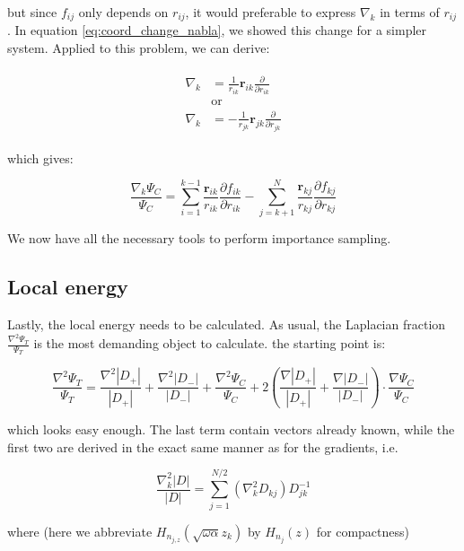 \documentclass[english, a4paper]{article}
\newcommand{\bm}[1]{\mathbf{#1}}
\begin{document}
	but since $f_{ij}$ only depends on $r_{ij}$, it would preferable to express $\nabla_k$ in terms of $r_{ij}$. In equation \ref{eq:coord_change_nabla}, we showed this change for a simpler system. Applied to this problem, we can derive:
	
	\begin{align}
	\begin{split}
	\nabla_k &=  \frac{1}{r_{ik}}\bm{r}_{ik}\frac{\partial}{\partial r_{ik}}\\
	&\text{or}\\
	\nabla_k &=  -\frac{1}{r_{jk}}\bm{r}_{jk}\frac{\partial}{\partial r_{jk}}
	\end{split}
	\end{align}
	
	which gives:
	
	\begin{equation}
	\frac{\nabla_k \Psi_C}{\Psi_C} = \sum_{i=1}^{k-1}\frac{\bm{r}_{ik}}{r_{ik}}\frac{\partial f_{ik}}{\partial r_{ik}} - \sum_{j=k+1}^{N}\frac{\bm{r}_{kj}}{r_{kj}}\frac{\partial f_{kj}}{\partial r_{kj}}
	\end{equation}
	
	We now have all the necessary tools to perform importance sampling.
	
	\subsection{Local energy}
	Lastly, the local energy needs to be calculated. As usual, the Laplacian fraction $\frac{\nabla^2\Psi_T}{\Psi_T}$ is the most demanding object to calculate. the starting point is:
	
	\begin{equation}
	\frac{\nabla^2\Psi_T}{\Psi_T} = \frac{\nabla^2 |D_+|}{|D_+|} + \frac{\nabla^2 |D_-|}{|D_-|} + \frac{\nabla^2 \Psi_C}{\Psi_C} + 2\left( \frac{\nabla |D_+|}{|D_+|} + \frac{\nabla |D_-|}{|D_-|} \right)\cdot\frac{\nabla \Psi_C}{\Psi_C}
	\end{equation}
	
	which looks easy enough. The last term contain vectors already known, while the first two are derived in the exact same manner as for the gradients, i.e.
	
	\begin{equation}
	\frac{\nabla_k^2|D|}{|D|} = \sum_{j=1}^{N/2}(\nabla_k^2D_{kj})D_{jk}^{-1}
	\end{equation}
	
	where (here we abbreviate $H_{n_{j,z}}(\sqrt{\omega\alpha}z_k)$ by $H_{n_j}(z)$ for compactness)
	
\end{document}
